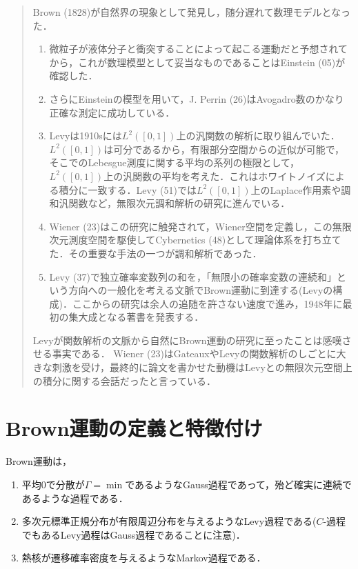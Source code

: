 \documentclass[uplatex,dvipdfmx]{jsreport}
\begin{document}
\begin{quotation}
    Brown (1828)が自然界の現象として発見し，随分遅れて数理モデルとなった．
    \begin{enumerate}
        \item 微粒子が液体分子と衝突することによって起こる運動だと予想されてから，これが数理模型として妥当なものであることはEinstein (05)が確認した．
        \item さらにEinsteinの模型を用いて，J. Perrin (26)はAvogadro数のかなり正確な測定に成功している．
        \item Levyは1910sには$L^2([0,1])$上の汎関数の解析に取り組んでいた．$L^2([0,1])$は可分であるから，有限部分空間からの近似が可能で，そこでのLebesgue測度に関する平均の系列の極限として，$L^2([0,1])$上の汎関数の平均を考えた．これはホワイトノイズによる積分に一致する．Levy (51)では$L^2([0,1])$上のLaplace作用素や調和汎関数など，無限次元調和解析の研究に進んでいる．
        \item Wiener (23)はこの研究に触発されて，Wiener空間を定義し，この無限次元測度空間を駆使してCybernetics (48)として理論体系を打ち立てた．その重要な手法の一つが調和解析であった．
        \item Levy (37)で独立確率変数列の和を，「無限小の確率変数の連続和」という方向への一般化を考える文脈でBrown運動に到達する(Levyの構成)．ここからの研究は余人の追随を許さない速度で進み，1948年に最初の集大成となる著書を発表する．
    \end{enumerate}
    Levyが関数解析の文脈から自然にBrown運動の研究に至ったことは感嘆させる事実である．
    Wiener (23)はGateauxやLevyの関数解析のしごとに大きな刺激を受け，最終的に論文を書かせた動機はLevyとの無限次元空間上の積分に関する会話だったと言っている．
\end{quotation}

\section{Brown運動の定義と特徴付け}

\begin{tcolorbox}[colframe=ForestGreen, colback=ForestGreen!10!white,breakable,colbacktitle=ForestGreen!40!white,coltitle=black,fonttitle=\bfseries\sffamily,
title=]
    Brown運動は，
    \begin{enumerate}
        \item 平均$0$で分散が$\Gamma=\min$であるようなGauss過程であって，殆ど確実に連続であるような過程である．
        \item 多次元標準正規分布が有限周辺分布を与えるようなLevy過程である($C$-過程でもあるLevy過程はGauss過程であることに注意)．
        \item 熱核が遷移確率密度を与えるようなMarkov過程である．
    \end{enumerate}
\end{tcolorbox}
\end{document}
